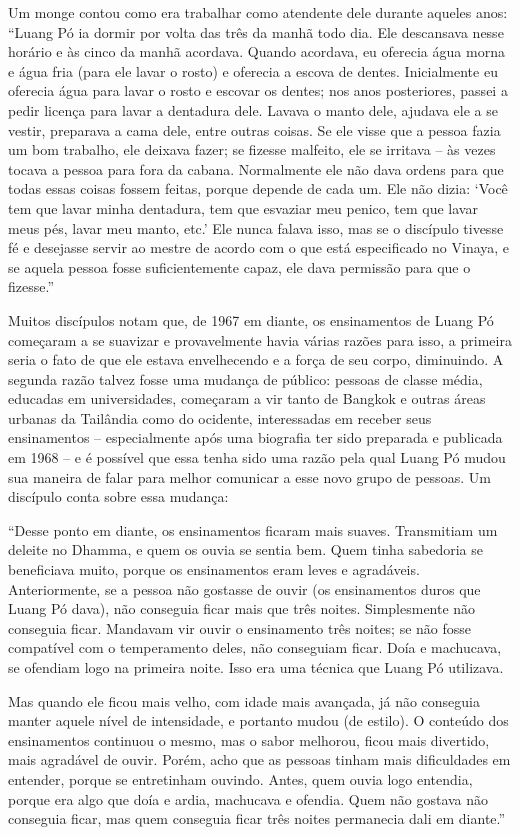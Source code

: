Um monge contou como era trabalhar como atendente dele durante aqueles
anos: ``Luang Pó ia dormir por volta das três da manhã todo dia. Ele
descansava nesse horário e às cinco da manhã acordava. Quando acordava,
eu oferecia água morna e água fria (para ele lavar o rosto) e oferecia a
escova de dentes. Inicialmente eu oferecia água para lavar o rosto e
escovar os dentes; nos anos posteriores, passei a pedir licença para
lavar a dentadura dele. Lavava o manto dele, ajudava ele a se vestir,
preparava a cama dele, entre outras coisas. Se ele visse que a pessoa
fazia um bom trabalho, ele deixava fazer; se fizesse malfeito, ele se
irritava -- às vezes tocava a pessoa para fora da cabana. Normalmente
ele não dava ordens para que todas essas coisas fossem feitas, porque
depende de cada um. Ele não dizia: `Você tem que lavar minha dentadura,
tem que esvaziar meu penico, tem que lavar meus pés, lavar meu manto,
etc.' Ele nunca falava isso, mas se o discípulo tivesse fé e desejasse
servir ao mestre de acordo com o que está especificado no Vinaya, e se
aquela pessoa fosse suficientemente capaz, ele dava permissão para que o
fizesse.''

Muitos discípulos notam que, de 1967 em diante, os ensinamentos de Luang
Pó começaram a se suavizar e provavelmente havia várias razões para
isso, a primeira seria o fato de que ele estava envelhecendo e a força
de seu corpo, diminuindo. A segunda razão talvez fosse uma mudança de
público: pessoas de classe média, educadas em universidades, começaram a
vir tanto de Bangkok e outras áreas urbanas da Tailândia como do
ocidente, interessadas em receber seus ensinamentos -- especialmente
após uma biografia ter sido preparada e publicada em 1968 -- e é
possível que essa tenha sido uma razão pela qual Luang Pó mudou sua
maneira de falar para melhor comunicar a esse novo grupo de pessoas. Um
discípulo conta sobre essa mudança:

``Desse ponto em diante, os ensinamentos ficaram mais suaves.
Transmitiam um deleite no Dhamma, e quem os ouvia se sentia bem. Quem
tinha sabedoria se beneficiava muito, porque os ensinamentos eram leves
e agradáveis. Anteriormente, se a pessoa não gostasse de ouvir (os
ensinamentos duros que Luang Pó dava), não conseguia ficar mais que três
noites. Simplesmente não conseguia ficar. Mandavam vir ouvir o
ensinamento três noites; se não fosse compatível com o temperamento
deles, não conseguiam ficar. Doía e machucava, se ofendiam logo na
primeira noite. Isso era uma técnica que Luang Pó utilizava.

Mas quando ele ficou mais velho, com idade mais avançada, já não
conseguia manter aquele nível de intensidade, e portanto mudou (de
estilo). O conteúdo dos ensinamentos continuou o mesmo, mas o sabor
melhorou, ficou mais divertido, mais agradável de ouvir. Porém, acho que
as pessoas tinham mais dificuldades em entender, porque se entretinham
ouvindo. Antes, quem ouvia logo entendia, porque era algo que doía e
ardia, machucava e ofendia. Quem não gostava não conseguia ficar, mas
quem conseguia ficar três noites permanecia dali em diante.''


